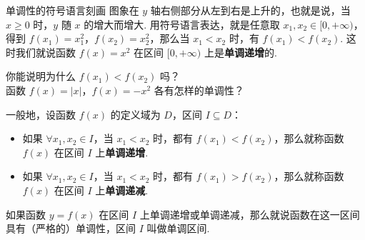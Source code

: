 \documentclass[aspectratio=169, 10pt]{beamer}
\begin{document}
	\begin{frame}{单调性的符号语言刻画}
		图象在 \(y\) 轴右侧部分从左到右是上升的，也就是说，当 \(x \geqslant 0\) 时，\(y\) 随 \(x\) 的增大而增大. 用符号语言表达，就是任意取 \(x_1, x_2 \in [0, +\infty)\)，得到 \(f(x_1)=x_1^2\)，\(f(x_2)=x_2^2\)，那么当 \(x_1 < x_2\) 时，有 \(f(x_1) < f(x_2)\). 这时我们就说函数 \(f(x)=x^2\) 在区间 \([0, +\infty)\) 上是\textbf{单调递增}的.
		
		\vspace{0.5cm}
		\begin{thinkbox}
			你能说明为什么 \(f(x_1) < f(x_2)\) 吗？\\
			函数 \(f(x)=|x|\)，\(f(x)=-x^2\) 各有怎样的单调性？
		\end{thinkbox}
		
		\vspace{0.5cm}
		一般地，设函数 \(f(x)\) 的定义域为 \(D\)，区间 \(I \subseteq D\)：
		\begin{itemize}
			\item 如果 \(\forall x_1, x_2 \in I\)，当 \(x_1 < x_2\) 时，都有 \(f(x_1) < f(x_2)\)，那么就称函数 \(f(x)\) 在区间 \(I\) 上\textbf{单调递增}.
			\item 如果 \(\forall x_1, x_2 \in I\)，当 \(x_1 < x_2\) 时，都有 \(f(x_1) > f(x_2)\)，那么就称函数 \(f(x)\) 在区间 \(I\) 上\textbf{单调递减}.
		\end{itemize}
		如果函数 \(y=f(x)\) 在区间 \(I\) 上单调递增或单调递减，那么就说函数在这一区间具有（严格的）单调性，区间 \(I\) 叫做单调区间.
	\end{frame}
	
\end{document}
